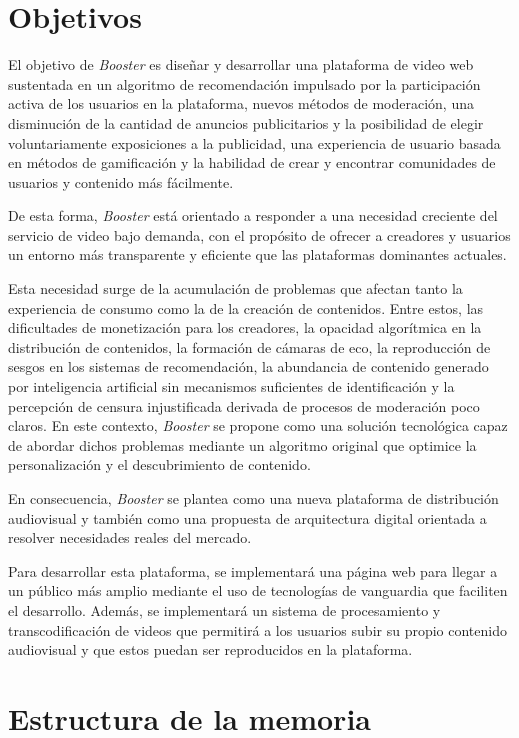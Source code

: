 \section{Objetivos}


El objetivo de \textit{Booster} es diseñar y desarrollar una plataforma de video web sustentada en un algoritmo de recomendación impulsado por la participación activa de los usuarios en la plataforma, nuevos métodos de moderación, una disminución de la cantidad de anuncios publicitarios y la posibilidad de elegir voluntariamente exposiciones a la publicidad, una experiencia de usuario basada en métodos de gamificación y la habilidad de crear y encontrar comunidades de usuarios y contenido más fácilmente. 

De esta forma, \textit{Booster} está orientado a responder a una necesidad creciente del servicio de video bajo demanda, con el propósito de ofrecer a creadores y usuarios un entorno más transparente y eficiente que las plataformas dominantes actuales.

Esta necesidad surge de la acumulación de problemas que afectan tanto la experiencia de consumo como la de la creación de contenidos. Entre estos, las dificultades de monetización para los creadores, la opacidad algorítmica en la distribución de contenidos, la formación de cámaras de eco, la reproducción de sesgos en los sistemas de recomendación, la abundancia de contenido generado por inteligencia artificial sin mecanismos suficientes de identificación y la percepción de censura injustificada derivada de procesos de moderación poco claros. En este contexto, \textit{Booster} se propone como una solución tecnológica capaz de abordar dichos problemas mediante un algoritmo original que optimice la personalización y el descubrimiento de contenido. 

En consecuencia, \textit{Booster} se plantea como una nueva plataforma de distribución audiovisual y también como una propuesta de arquitectura digital orientada a resolver necesidades reales del mercado.

Para desarrollar esta plataforma, se implementará una página web para llegar a un público más amplio mediante el uso de tecnologías de vanguardia que faciliten el desarrollo. Además, se implementará un sistema de procesamiento y transcodificación de videos que permitirá a los usuarios subir su propio contenido audiovisual y que estos puedan ser reproducidos en la plataforma.


\section{Estructura de la memoria}

